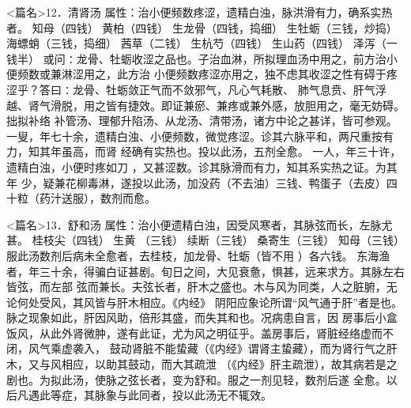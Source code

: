 \documentclass[a4paper,12pt,UTF8,twoside]{ctexbook}
\begin{document}
<篇名>12．清肾汤
属性：治小便频数疼涩，遗精白浊，脉洪滑有力，确系实热者。 
知母（四钱） 黄柏（四钱） 生龙骨（四钱，捣细） 生牡蛎（三钱，炒捣） 海螵蛸（三钱，捣细） 
茜草（二钱） 生杭芍（四钱） 生山药（四钱） 泽泻（一钱半） 
或问∶龙骨、牡蛎收涩之品也。子治血淋，所拟理血汤中用之，前方治小便频数或兼淋涩用之，此方治 
小便频数疼涩亦用之，独不虑其收涩之性有碍于疼涩乎？答曰∶龙骨、牡蛎敛正气而不敛邪气，凡心气耗散、 
肺气息贲、肝气浮越、肾气滑脱，用之皆有捷效。即证兼瘀、兼疼或兼外感，放胆用之，毫无妨碍。拙拟补络 
补管汤、理郁升陷汤、从龙汤、清带汤，诸方中论之甚详，皆可参观。 
一叟，年七十余，遗精白浊、小便频数，微觉疼涩。诊其六脉平和，两尺重按有力，知其年虽高，而肾 
经确有实热也。投以此汤，五剂全愈。 
一人，年三十许，遗精白浊，小便时疼如刀 ，又甚涩数。诊其脉滑而有力，知其系实热之证。为其年 
少，疑兼花柳毒淋，遂投以此汤，加没药（不去油）三钱、鸭蛋子（去皮）四十粒（药汁送服），数剂而愈。 


<篇名>13．舒和汤
属性：治小便遗精白浊，因受风寒者，其脉弦而长，左脉尤甚。 
桂枝尖（四钱） 生黄 （三钱） 续断（三钱） 桑寄生（三钱） 知母（三钱） 
服此汤数剂后病未全愈者，去桂枝，加龙骨、牡蛎（皆不用 ）各六钱。 
东海渔者，年三十余，得骗白证甚剧。旬日之间，大见衰惫，惧甚，远来求方。其脉左右皆弦，而左部 
弦而兼长。夫弦长者，肝木之盛也。木与风为同类，人之脏腑，无论何处受风，其风皆与肝木相应。《内经》 
阴阳应象论所谓“风气通于肝”者是也。脉之现象如此，肝因风助，倍形其盛，而失其和也。况病患自言，因 
房事后小盒饭风，从此外肾微肿，遂有此证，尤为风之明征乎。盖房事后，肾脏经络虚而不闭，风气乘虚袭入， 
鼓动肾脏不能蛰藏（《内经》谓肾主蛰藏），而为肾行气之肝木，又与风相应，以助其鼓动，而大其疏泄 
（《内经》肝主疏泄），故其病若是之剧也。为拟此汤，使脉之弦长者，变为舒和。服之一剂见轻，数剂后遂 
全愈。以后凡遇此等症，其脉象与此同者，投以此汤无不辄效。 
\end{document}
